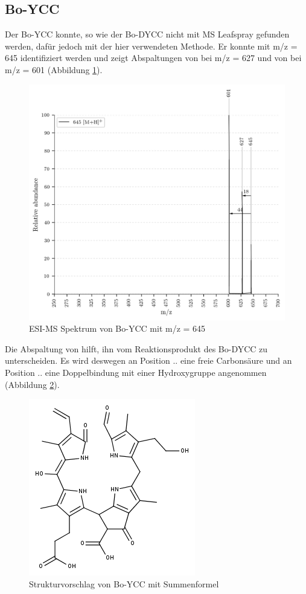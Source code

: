 \subsection{Bo-YCC}

Der Bo-YCC konnte, so wie der Bo-DYCC nicht mit MS Leafspray gefunden werden, dafür jedoch mit der hier verwendeten Methode. Er konnte mit m/z = 645 identifiziert werden und zeigt Abspaltungen von  bei m/z = 627 und von  bei m/z = 601 (Abbildung \ref{fig:645MH}). 

\begin{figure}[!htbp]
  \centering
  \includegraphics[width=\textwidth, height=0.7\textwidth]{figures/Kapitel7/Kataboliten/VWA_MS_645-1.png}
  \caption[ESI-MS Spektrum von Bo-YCC, Quelle: Autor]{ESI-MS Spektrum von Bo-YCC mit m/z = 645}
  \label{fig:645MH}
\end{figure}

Die Abspaltung von  hilft, ihn vom Reaktionsprodukt des Bo-DYCC zu unterscheiden. Es wird deswegen an Position .. eine freie Carbonsäure und an Position .. eine Doppelbindung mit einer Hydroxygruppe angenommen (Abbildung \ref{fig:645MStruktur}).

\begin{figure}[!htbp]
  \centering
  \includegraphics[scale=0.6]{figures/Kapitel7/Kataboliten/fragmentation_structures/VWA_Katabolit_645_vorReaktion.png}
  \caption[Strukturvorschlag von Bo-YCC, Quelle: Autor]{Strukturvorschlag von Bo-YCC mit Summenformel \ch{}}
  \label{fig:645MStruktur}
\end{figure}

